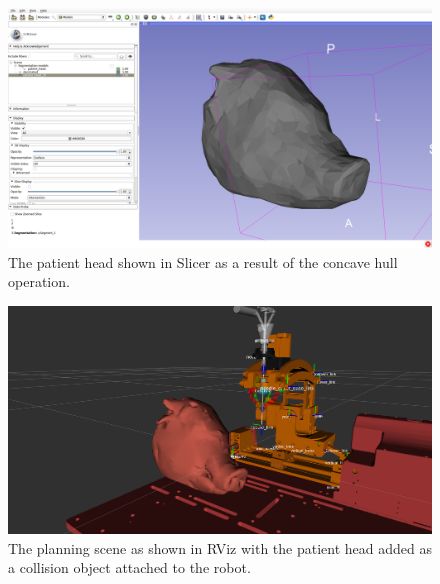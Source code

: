\documentclass[12pt]{report}
\begin{document}
\begin{figure}[thpb]
	\centering
	\includegraphics[width=\textwidth]{images/segmentation_convex_hull.png}
    \caption{The patient head shown in Slicer as a result of the concave hull operation.}
    \label{fig:headMeshConcave}
\end{figure}

\begin{figure}[thpb]
	\centering
	\includegraphics[width=\textwidth]{images/segmentation_rviz.png}
    \caption{The planning scene as shown in RViz with the patient head added as a collision object attached to the robot.}
    \label{fig:patientHeadInPlanningScene}
\end{figure}


\end{document}

